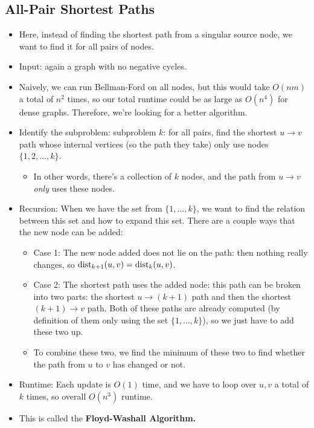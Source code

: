 	\subsection{All-Pair Shortest Paths}
	\begin{itemize}
		\item Here, instead of finding the shortest path from a singular source node, we want to find 
			it for all pairs of nodes. 
		\item Input: again a graph with no negative cycles.
		\item Naively, we can run Bellman-Ford on all nodes, but this would take $O(nm)$ a total 
			of $n^2$ times, so our total runtime could be as large as $O(n^4)$ for dense graphs.
			Therefore, we're looking for a better algorithm.
		\item Identify the subproblem: subproblem $k$: for all pairs, find the shortest $u \to v$ path 
			whose internal vertices (so the path they take) only use nodes $\{1, 2, \dots, k\}$.
			\begin{itemize}
				\item In other words, there's a collection of $k$ nodes, and the path from $u \to v$ 
					\textit{only} uses these nodes.
			\end{itemize}
		\item Recursion: When we have the set from $\{1, \dots, k\}$, we want to find the relation between 
			this set and how to expand this set. There are a couple ways that the new 
			node can be added:
			\begin{itemize}
				\item Case 1: The new node added does not lie on the path: then nothing really changes, so 
					$\mathrm{dist}_{k +1}(u, v) = \mathrm{dist}_k(u, v)$.
				\item Case 2: The shortest path uses the added node: this path can be broken into two 
					parts: the shortest $u \to (k+1)$ path and then the shortest $(k+1) \to v$ path. 
					Both of these paths are already computed (by definition of them only using 
					the set $\{1, \dots, k\} $), so we just have to add these two up. 
				\item To combine these two, we find the minimum of these two to find whether the 
					path from $u$ to $v$ has changed or not.  
			\end{itemize}
		\item Runtime: Each update is $O(1)$ time, and we have to loop over $u, v$ a total of $k$ times, 
			so overall $O(n^3)$ runtime. 
		\item This is called the \textbf{Floyd-Washall Algorithm.}
	\end{itemize}
